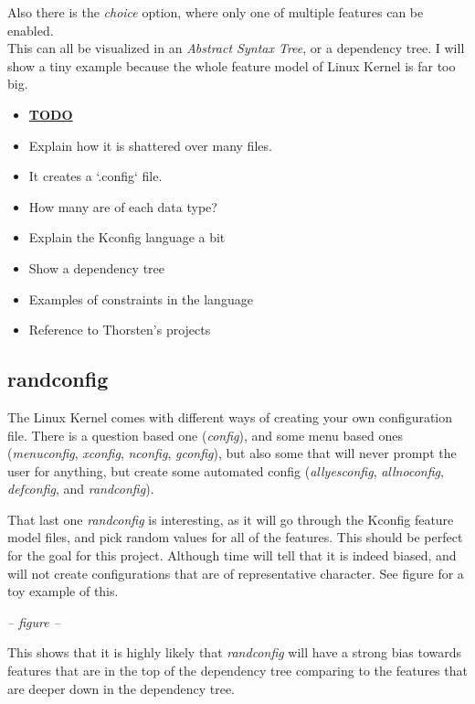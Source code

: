 \documentclass[a4paper,11pt]{article}
\begin{document}
Also there is the \emph{choice} option, where only one of multiple features 
can be enabled. \\


This can all be visualized in an \emph{Abstract Syntax Tree}, or a dependency 
tree. I will show a tiny example because the whole feature model of Linux 
Kernel is far too big.


\begin{itemize}
    \item \underline{\textbf{TODO}}
    \item Explain how it is shattered over many files.
    \item It creates a `.config` file.
    \item How many are of each data type?
    \item Explain the Kconfig language a bit
    \item Show a dependency tree
    \item Examples of constraints in the language
    \item Reference to Thorsten's projects
\end{itemize}

\subsection{randconfig}

The Linux Kernel comes with different ways of creating your own configuration 
file. There is a question based one (\emph{config}), and some menu based ones 
(\emph{menuconfig}, \emph{xconfig}, \emph{nconfig}, \emph{gconfig}), but also 
some that will never prompt the user for anything, but create some automated 
config (\emph{allyesconfig}, \emph{allnoconfig}, \emph{defconfig}, and 
\emph{randconfig}).

That last one \emph{randconfig} is interesting, as it will go through the 
Kconfig feature model files, and pick random values for all of the features. 
This should be perfect for the goal for this project. Although time will tell 
that it is indeed biased, and will not create configurations that are of 
representative character. See figure for a toy example of this.


\begin{center}
    \emph{-- figure --}
\end{center}


This shows that it is highly likely that \emph{randconfig} will have a strong 
bias towards features that are in the top of the dependency tree comparing to 
the features that are deeper down in the dependency tree. 
\end{document}
